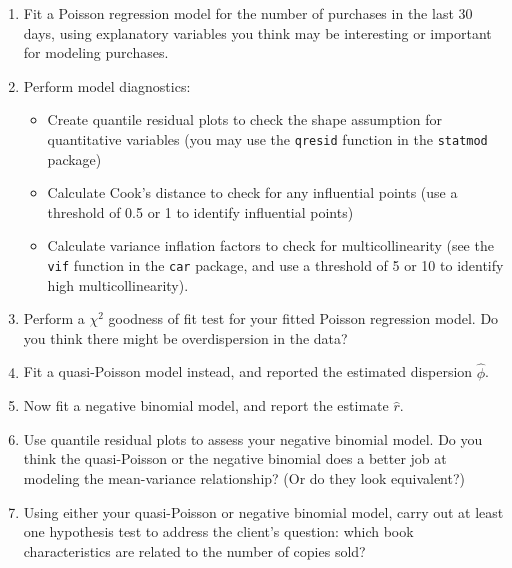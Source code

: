 \documentclass[11pt]{article}
\begin{document}
\begin{enumerate}
\begin{enumerate}
\item Fit a Poisson regression model for the number of purchases in the last 30 days, using explanatory variables you think may be interesting or important for modeling purchases.

\item Perform model diagnostics:
\begin{itemize}
\item Create quantile residual plots to check the shape assumption for quantitative variables (you may use the \verb;qresid; function in the \verb;statmod; package)

\item Calculate Cook’s distance to check for any influential points (use a threshold of 0.5 or 1 to identify influential points)

\item Calculate variance inflation factors to check for multicollinearity (see the \verb;vif; function in the \verb;car; package, and use a threshold of 5 or 10 to identify high multicollinearity).
\end{itemize}

\item Perform a $\chi^2$ goodness of fit test for your fitted Poisson regression model. Do you think there might be overdispersion in the data?

\item Fit a quasi-Poisson model instead, and reported the estimated dispersion $\widehat{\phi}$.

\item Now fit a negative binomial model, and report the estimate $\widehat{r}$.

\item Use quantile residual plots to assess your negative binomial model. Do you think the quasi-Poisson or the negative binomial does a better job at modeling the mean-variance relationship? (Or do they look equivalent?)

\item Using either your quasi-Poisson or negative binomial model, carry out at least one hypothesis test to address the client's question: which book characteristics are related to the number of copies sold?
\end{enumerate}

\end{enumerate}
\end{document}
